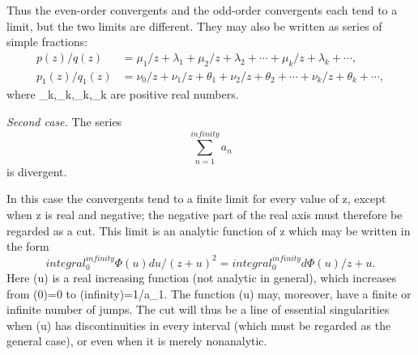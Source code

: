 \documentclass[
  paper=b5,
  fontsize=13pt,
  twoside,
  headings=normal,
  bookmarkpackage=false
]{scrartcl}
\theoremstyle{stieltjesplain}
\theoremstyle{stieltjesdefinition}
\def\({}\def\){}%
\def\int{integral}%
\def\frac#1#2{#1/#2}%
\def\infty{infinity}%
\def\,{ }%
\begin{document}
Thus the even-order convergents and the odd-order convergents each tend
to a limit, but the two limits are different. They may also be written as
series of simple fractions:
\begin{align*}
 \frac{p(z)}{q(z)}
   &=\frac{\mu_1}{z+\lambda_1}
     +\frac{\mu_2}{z+\lambda_2}+\cdots
     +\frac{\mu_k}{z+\lambda_k}+\cdots,\\
 \frac{p_1(z)}{q_1(z)}
   &=\frac{\nu_0}{z}
     +\frac{\nu_1}{z+\theta_1}+\frac{\nu_2}{z+\theta_2}+\cdots
     +\frac{\nu_k}{z+\theta_k}+\cdots,
\end{align*}
where \(\mu_k,\lambda_k,\nu_k,\theta_k\) are positive real numbers.

\emph{Second case.} The series
\[
 \sum_{n=1}^{\infty}a_n
\]
is divergent.

In this case the convergents tend to a finite limit for every value of
\(z\), except when \(z\) is real and negative; the negative part of the
real axis must therefore be regarded as a cut. This limit is an analytic
function of \(z\) which may be written in the form
\label{eq:intro-stieltjes-integral}
\begin{equation*}
 \int_0^{\infty}\frac{\Phi(u)\,du}{(z+u)^2}
   =\int_0^{\infty}\frac{d\Phi(u)}{z+u}.
\end{equation*}
Here \(\Phi(u)\) is a real increasing function (not analytic in general),
which increases from \(\Phi(0)=0\) to
\(\Phi(\infty)=1/a_1\). The function \(\Phi(u)\) may, moreover, have a
finite or infinite number of jumps. The cut will thus be a line of
essential singularities when \(\Phi(u)\) has discontinuities in every
interval (which must be regarded as the general case), or even when it is
merely nonanalytic.
\end{document}
